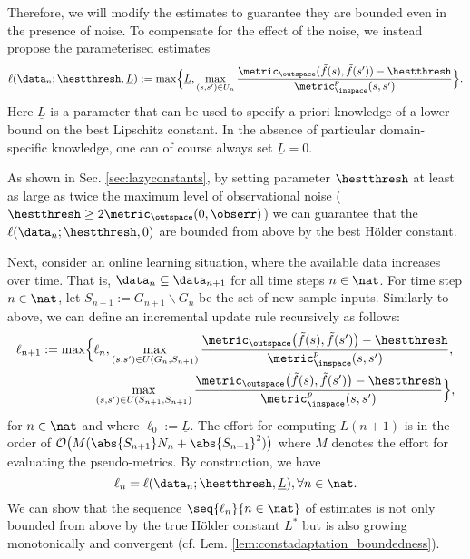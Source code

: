 Therefore, we will modify the estimates to guarantee they are bounded even in the presence of noise. 
To compensate for the effect of the noise, we instead propose the parameterised estimates 
%
\begin{equation}\label{eq:lazyconstupdaterule_batch_main}
\ell(\data_n;\hestthresh,\underline L)  := 
 \max \Bigl\{ \underline L, \max_{(s,s') \in U_n} \frac{\metric_\outspace(\tilde f(s),\tilde f(s')) - \hestthresh}{\metric_{\inspace}^p(s,s')} \Bigr\}.
\end{equation}
%
Here $\underline L$ is a parameter that can be used to specify a priori knowledge of a lower bound on the best Lipschitz constant. In the absence of particular domain-specific knowledge, one can of course always set $\underline L =0$.
\begin{rem}
As shown in Sec. \ref{sec:lazyconstants}, by setting parameter $\hestthresh$ at least as large as twice the maximum level of observational noise ($\hestthresh \geq 2 \metric_{\outspace}(0,\obserr)$) we can guarantee that the $\ell(\data_n;\hestthresh,0)$ are bounded from above by the best H\"older constant. 
\end{rem}
Next, consider an online learning situation, where the available data increases over time. 
That is, $\data_n \subseteq \data_{n+1}$ for all time steps $n \in \nat$. 
For time step $n \in \nat$, let $S_{n+1} := G_{n+1} \backslash G_n$ be the set of new sample inputs.
Similarly to above, we can define an incremental update rule recursively as follows: 
\begin{align} \label{eq:Hoelconstlazyupdateincr_main}
\ell_{n+1} := \max\Bigl\{ & \ell_n, \max_{(s,s') \in U(G_n, S_{n+1})} \frac{\metric_\outspace\bigl(\tilde f(s),\tilde f(s')\bigr) - \hestthresh}{\metric_{\inspace}^p(s,s')},\\
&\max_{(s,s') \in U(S_{n+1}, S_{n+1})} \frac{\metric_\outspace\bigl(\tilde f(s),\tilde f(s')\bigr) - \hestthresh}{\metric_{\inspace}^p(s,s')} \Bigr\},
\end{align} for $n \in \nat$ 
and where 
$\ell_0 := \underline L$. 
The effort for computing $L(n+1)$ is in the order of $\mathcal O\bigl(M (\abs{S_{n+1}} N_n+ \abs{S_{n+1}}^2)\bigr)$ where $M$ denotes the effort for evaluating the pseudo-metrics.
By construction, we have \[\ell_n =\ell(\mathcal \data_n;\hestthresh,\underline L), \forall n \in \nat.\] 
We can show that the sequence $\seq{\ell_n}{n\in \nat}$ of estimates is not only bounded from above by the true H\"older constant $L^*$ but is also growing monotonically and convergent (cf. Lem. \ref{lem:constadaptation_boundedness}).

